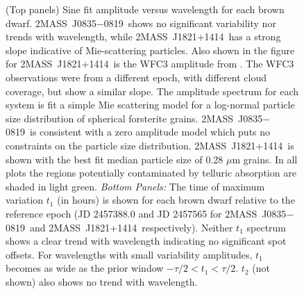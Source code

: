 \documentclass[twocolumn]{aastex6}
\newcommand{\sha}{2MASS~J0835$-$0819}
\newcommand{\shb}{2MASS~J1821+1414}
\begin{document}
\begin{figure}
\centering
{}
	\caption{(Top panels) Sine fit amplitude versus wavelength for each brown dwarf. \sha\ shows no significant variability nor trends with wavelength, while \shb\ has a strong slope indicative of Mie-scattering particles.
	 Also shown in the figure for \shb\ is the WFC3 amplitude from \citet{2015ApJ...798L..13Y}. The WFC3 observations were from a different epoch, with different cloud coverage, but show a similar slope.
	 The amplitude spectrum for each system is fit a simple Mie scattering model for a log-normal particle size distribution of spherical forsterite grains.
	 \sha\ is consistent with a zero amplitude model which puts no constraints on the particle size distribution.
	 \shb\ is shown with the best fit median particle size of 0.28 $\mu$m grains.
	 In all plots the regions potentially contaminated by telluric absorption are shaded in light green.
	 {\it Bottom Panels:} The time of maximum variation $t_1$ (in hours) is shown for each brown dwarf relative to the reference epoch (JD 2457388.0 and JD 2457565 for \sha\ and \shb\ respectively).
	 Neither $t_1$ spectrum shows a clear trend with wavelength indicating no significant spot offsets.
	 For wavelengths with small variability amplitudes, $t_1$ becomes as wide as the prior window $-\tau/2 < t_1 < \tau/2$. $t_2$ (not shown) also shows no trend with wavelength.}
	\label{fig:ampSpec}
\end{figure} 
\end{document}

